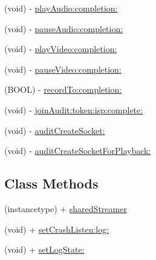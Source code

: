 \begin{DoxyCompactItemize}
\item 
(void) -\/ \hyperlink{interface_c_c_streamer_basic_a6ed3877a3e3d2a4a9cb3be32b566b261}{play\+Audio\+:completion\+:}
\item 
(void) -\/ \hyperlink{interface_c_c_streamer_basic_a78af8bc6810731775ba13a3272c6f93e}{pause\+Audio\+:completion\+:}
\item 
(void) -\/ \hyperlink{interface_c_c_streamer_basic_afe7bec4a43b1b497fec36b061c0ea090}{play\+Video\+:completion\+:}
\item 
(void) -\/ \hyperlink{interface_c_c_streamer_basic_a52ea0a4735f76f199f6d314e2cc159ad}{pause\+Video\+:completion\+:}
\item 
(B\+O\+OL) -\/ \hyperlink{interface_c_c_streamer_basic_aae5fa8e92538f309f2eac0d0bd194d2f}{record\+To\+:completion\+:}
\item 
(void) -\/ \hyperlink{interface_c_c_streamer_basic_a3c49ff3e0e96a1001913c6cd9a0ebc36}{join\+Audit\+:token\+:isp\+:complete\+:}
\item 
(void) -\/ \hyperlink{interface_c_c_streamer_basic_ad0107408438386061abe80c874918287}{audit\+Create\+Socket\+:}
\item 
(void) -\/ \hyperlink{interface_c_c_streamer_basic_af982e16a8c40013832a86f96d9af7d62}{audit\+Create\+Socket\+For\+Playback\+:}
\end{DoxyCompactItemize}
\subsection*{Class Methods}
\begin{DoxyCompactItemize}
\item 
(instancetype) + \hyperlink{interface_c_c_streamer_basic_a8bb923e9c31c4bb3a75e22117464d0aa}{shared\+Streamer}
\item 
(void) + \hyperlink{interface_c_c_streamer_basic_ac720b0a4b258eebdc14ab97bac4dc42d}{set\+Crash\+Listen\+:log\+:}
\item 
(void) + \hyperlink{interface_c_c_streamer_basic_a7a39b2d3550aba9f219aa0fb9d88e860}{set\+Log\+State\+:}
\end{DoxyCompactItemize}
